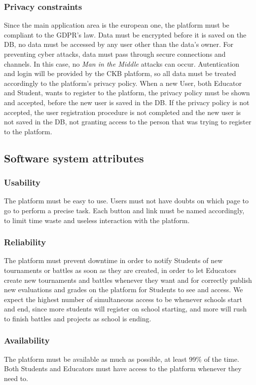 \documentclass{article}
\begin{document}
{\subsubsection{Privacy constraints}
Since the main application area is the european one, the platform must be compliant to the GDPR's law.
Data must be encrypted before it is saved on the DB, no data must be accessed by any user other than the data's owner.
For preventing cyber attacks, data must pass through secure connections and channels. In this case, no \textit{Man in the Middle} attacks can occur.
Autentication and login will be provided by the CKB platform, so all data must be treated accordingly to the platform's privacy policy.
When a new User, both Educator and Student, wants to register to the platform, the privacy policy must be shown and accepted, before the new user is saved in the DB.
If the privacy policy is not accepted, the user registration procedure is not completed and the new user is not saved in the DB, not granting access to the person that was
trying to register to the platform.
\subsection{Software system attributes}
\subsubsection{Usability}
The platform must be easy to use. Users must not have doubts on which page to go to perform a precise task.
Each button and link must be named accordingly, to limit time waste and useless interaction with the platform.
\subsubsection{Reliability}
The platform must prevent downtime in order to notify Students of new tournaments or battles as soon as they are created, in order to let
Educators create new tournaments and battles whenever they want and for correctly publish new evaluations and grades on the platform for
Students to see and access.
We expect the highest number of simultaneous access to be whenever schools start and end, since more students will register on school starting,
and more will rush to finish battles and projects as school is ending.
\subsubsection{Availability}
The platform must be available as much as possible, at least 99\% of the time.
Both Students and Educators must have access to the platform whenever they need to.
}
\end{document}
